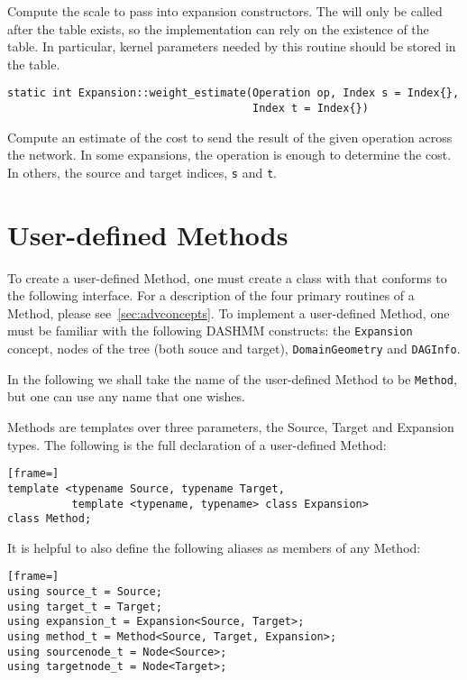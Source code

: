 \noindent Compute the scale to pass into expansion constructors. The will only
be called
after the table exists, so the implementation can rely on the existence of the
table. In particular, kernel parameters needed by this routine should be
stored in the table.

\begin{lstlisting}
static int Expansion::weight_estimate(Operation op, Index s = Index{},
                                      Index t = Index{})
\end{lstlisting}

\noindent Compute an estimate of the cost to send the result of the given
operation
across the network. In some expansions, the operation is enough to determine
the cost. In others, the source and target indices, \texttt{s} and \texttt{t}.



\section{User-defined Methods}

To create a user-defined Method, one must create a class with that conforms
to the following interface. For a description of the four primary routines
of a Method, please see~\ref{sec:advconcepts}. To implement a user-defined
Method, one must be familiar with the following DASHMM constructs: the
\texttt{Expansion} concept, nodes of the tree (both souce and target),
\texttt{DomainGeometry} and \texttt{DAGInfo}.

In the following we shall take the name of the user-defined Method to be
\texttt{Method}, but one can use any name that one wishes.

Methods are templates over three parameters, the Source, Target and Expansion
types. The following is the full declaration of a user-defined Method:

\begin{lstlisting}[frame=]
template <typename Source, typename Target,
          template <typename, typename> class Expansion>
class Method;
\end{lstlisting}

\noindent It is helpful to also define the following aliases as members of
any Method:

\begin{lstlisting}[frame=]
using source_t = Source;
using target_t = Target;
using expansion_t = Expansion<Source, Target>;
using method_t = Method<Source, Target, Expansion>;
using sourcenode_t = Node<Source>;
using targetnode_t = Node<Target>;
\end{lstlisting}

